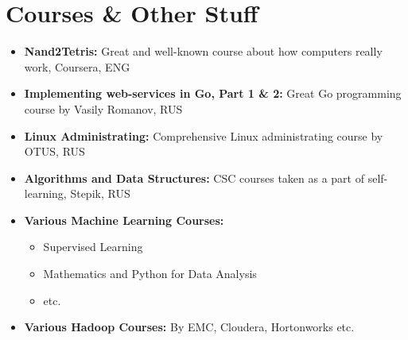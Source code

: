 \documentclass[letterpaper,10pt]{article}
\newcommand{\resumeItem}[2]{
  \item\small{
    \textbf{#1:}{ #2 \vspace{-2pt}}
  }
}
\newcommand{\resumeSubItem}[2]{\vspace{-0pt}\resumeItem{#1}{#2}\vspace{-0pt}}
\newcommand{\resumeSubHeadingListStart}{\begin{itemize}[leftmargin=*]}
\newcommand{\resumeSubHeadingListEnd}{\end{itemize}}
\begin{document}
\begin{minipage}[t]{0.33\textwidth}
\section{Courses \& Other Stuff}
  \resumeSubHeadingListStart
    \resumeSubItem{Nand2Tetris}
      {Great and well-known course about how computers really work, Coursera, ENG}
    \resumeSubItem{Implementing web-services in Go, Part 1 \& 2}
      {Great Go programming course by Vasily Romanov, RUS}
    \resumeSubItem{Linux Administrating}
      {Comprehensive Linux administrating course by OTUS, RUS}
    \resumeSubItem{Algorithms and Data Structures}
      {CSC courses taken as a part of self-learning, Stepik, RUS}
    \resumeSubItem{Various Machine Learning Courses}{
        \begin{itemize}[noitemsep,nolistsep]
            \item{\small{Supervised Learning}}
	   	    \item{\small{Mathematics and Python for Data Analysis}}
			\item{\small{etc.}}
	    \end{itemize}}
    \resumeSubItem {Various Hadoop Courses}
      {By EMC, Cloudera, Hortonworks etc.}
  \resumeSubHeadingListEnd




\end{minipage}
\end{document}
